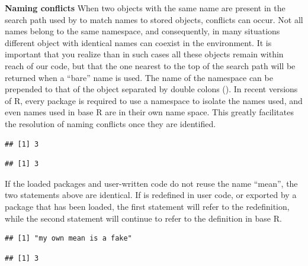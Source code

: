 \documentclass[krantz2]{krantz}\usepackage{knitr}%
\begin{document}
\begin{warningbox}
\textbf{Naming conflicts} When two objects with the same name are present in the search path used by \Rlang to match names to stored objects, conflicts can occur. Not all names belong to the same namespace, and consequently, in many situations different object with identical names can coexist in the \Rlang environment. It is important that you realize than in such cases all these objects remain within reach of our code, but that the one nearest to the top of the search path will be returned when a ``bare'' name is used. The name of the namespace can be prepended to that of the object separated by double colons (\code{::}). In recent versions of R, every package is required to use a namespace to isolate the names used, and even names used in base R are in their own name space. This greatly facilitates the resolution of naming conflicts once they are identified.

\begin{knitrout}\footnotesize
{}\color{fgcolor}\begin{kframe}
\begin{alltt}
\hlstd{(}\hlopt{:}\hlstd{)}
\end{alltt}
\begin{verbatim}
## [1] 3
\end{verbatim}
\begin{alltt}
\hlopt{::}\hlstd{(}\hlopt{:}\hlstd{)}
\end{alltt}
\begin{verbatim}
## [1] 3
\end{verbatim}
\end{kframe}
\end{knitrout}

If the loaded packages and user-written code do not reuse the name ``mean'', the two statements above are identical. If  is redefined in user code, or exported by a package that has been loaded, the first statement will refer to the redefinition, while the second statement will continue to refer to the definition in base R.

\begin{knitrout}\footnotesize
{}\color{fgcolor}\begin{kframe}
\begin{alltt}
 \hlkwb{<-} \hlstd{(}\hlstd{) \{}
\hlstd{\}}
\hlstd{(}\hlopt{:}\hlstd{)}
\end{alltt}
\begin{verbatim}
## [1] "my own mean is a fake"
\end{verbatim}
\begin{alltt}
\hlopt{::}\hlstd{(}\hlopt{:}\hlstd{)}
\end{alltt}
\begin{verbatim}
## [1] 3
\end{verbatim}
\end{kframe}
\end{knitrout}


\end{warningbox}
\end{document}
